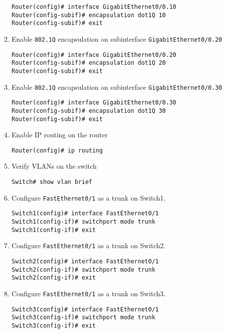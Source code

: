 \documentclass[a4paper]{book}
\begin{document}
\begin{enumerate}
\begin{lstlisting}
Router(config)# interface GigabitEthernet0/0.10
Router(config-subif)# encapsulation dot1Q 10
Router(config-subif)# exit
\end{lstlisting}

\item{Enable \texttt{802.1Q} encapsulation on subinterface \texttt{GigabitEthernet0/0.20}}

\begin{lstlisting}
Router(config)# interface GigabitEthernet0/0.20
Router(config-subif)# encapsulation dot1Q 20
Router(config-subif)# exit
\end{lstlisting}

\item{Enable \texttt{802.1Q} encapsulation on subinterface \texttt{GigabitEthernet0/0.30}}

\begin{lstlisting}
Router(config)# interface GigabitEthernet0/0.30
Router(config-subif)# encapsulation dot1Q 30
Router(config-subif)# exit
\end{lstlisting}

\item{Enable IP routing on the router}

\begin{lstlisting}
Router(config)# ip routing
\end{lstlisting}

\item{Verify VLANs on the switch}

\begin{lstlisting}
Switch# show vlan brief
\end{lstlisting}

\item{Configure \texttt{FastEthernet0/1} as a trunk on Switch1.}

\begin{lstlisting}
Switch1(config)# interface FastEthernet0/1
Switch1(config-if)# switchport mode trunk
Switch1(config-if)# exit
\end{lstlisting}

\item{Configure \texttt{FastEthernet0/1} as a trunk on Switch2.}
\begin{lstlisting}
Switch2(config)# interface FastEthernet0/1
Switch2(config-if)# switchport mode trunk
Switch2(config-if)# exit
\end{lstlisting}

\item{Configure \texttt{FastEthernet0/1} as a trunk on Switch3.}
\begin{lstlisting}
Switch3(config)# interface FastEthernet0/1
Switch3(config-if)# switchport mode trunk
Switch3(config-if)# exit
\end{lstlisting}


\end{enumerate}
\end{document}
